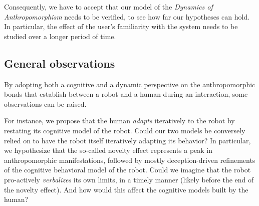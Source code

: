 \documentclass{frontiersSCNS} %
\begin{document}
Consequently, we have to accept that our model of the \emph{Dynamics of Anthropomorphism} needs to be verified, to see how far our hypotheses can hold. In particular, the effect of the user's familiarity with the system needs to be studied over a longer period of time.



%
%

%



\subsection{General observations}

By adopting both a cognitive and a dynamic perspective on the anthropomorphic
bonds that establish between a robot and a human during an interaction, some
observations can be raised.

For instance, we propose that the human \emph{adapts} iteratively to the robot
by restating its cognitive model of the robot. Could our two models be
conversely relied on to have the robot itself iteratively adapting its
behavior? In particular, we hypothesize that the so-called novelty effect
represents a peak in anthropomorphic manifestations, followed by mostly
deception-driven refinements of the cognitive behavioral model of the robot.
Could we imagine that the robot pro-actively \emph{verbalizes} its own limits,
in a timely manner (likely before the end of the novelty effect). And how would
this affect the cognitive models built by the human?
\end{document}
